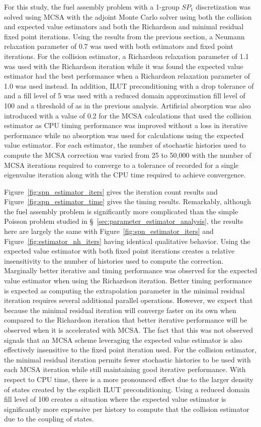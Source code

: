 For this study, the fuel assembly problem with a 1-group $SP_1$
discretization was solved using MCSA with the adjoint Monte Carlo
solver using both the collision and expected value estimators and both
the Richardson and minimal residual fixed point iterations. Using the
results from the previous section, a Neumann relaxation parameter of
0.7 was used with both estimators and fixed point iterations. For the
collision estimator, a Richardson relaxation parameter of 1.1 was used
with the Richardson iteration while it was found the expected value
estimator had the best performance when a Richardson relaxation
parameter of 1.0 was used instead. In addition, ILUT preconditioning
with a drop tolerance of  and a fill level of 5 was used
with a reduced domain approximation fill level of 100 and a threshold
of  as in the previous analysis. Artificial absorption was
also introduced with a value of 0.2 for the MCSA calculations that
used the collision estimator as CPU timing performance was improved
without a loss in iterative performance while no absorption was used
for calculations using the expected value estimator. For each
estimator, the number of stochastic histories used to compute the MCSA
correction was varied from 25 to 50,000 with the number of MCSA
iterations required to converge to a tolerance of  recorded
for a single eigenvalue iteration along with the CPU time required to
achieve convergence.

Figure~\ref{fig:spn_estimator_iters} gives the iteration count results
and Figure~\ref{fig:spn_estimator_time} gives the timing
results. Remarkably, although the fuel assembly problem is
significantly more complicated than the simple Poisson problem studied
in \S~\ref{sec:parameter_estimator_analysis}, the results here are
largely the same with Figure~\ref{fig:spn_estimator_iters} and
Figure~\ref{fig:estimator_nh_iters} having identical qualitative
behavior. Using the expected value estimator with both fixed point
iterations creates a relative insensitivity to the number of histories
used to compute the correction. Marginally better iterative and timing
performance was observed for the expected value estimator when using
the Richardson iteration. Better timing performance is expected as
computing the extrapolation parameter in the minimal residual
iteration requires several additional parallel operations. However, we
expect that because the minimal residual iteration will converge
faster on its own when compared to the Richardson iteration that
better iterative performance will be observed when it is accelerated
with MCSA. The fact that this was not observed signals that an MCSA
scheme leveraging the expected value estimator is also effectively
insensitive to the fixed point iteration used. For the collision
estimator, the minimal residual iteration permits fewer stochastic
histories to be used with each MCSA iteration while still maintaining
good iterative performance. With respect to CPU time, there is a more
pronounced effect due to the larger density of states created by the
explicit ILUT preconditioning. Using a reduced domain fill level of
100 creates a situation where the expected value estimator is
significantly more expensive per history to compute that the collision
estimator due to the coupling of states.

